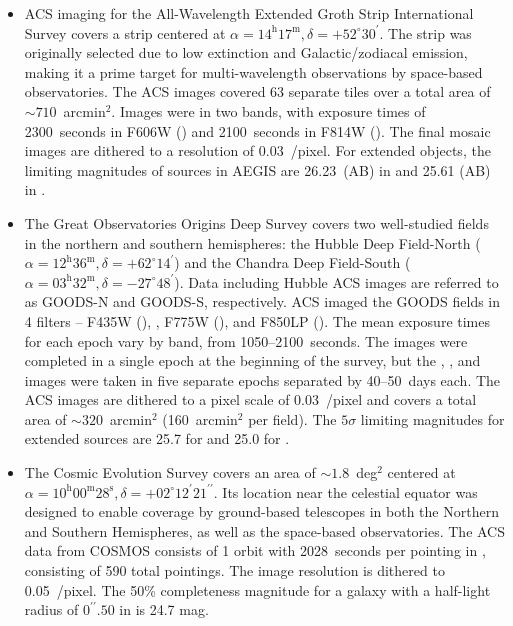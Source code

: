 \documentclass[twocolumn]{aastex6}
\begin{document}
\begin{itemize}
\item \hubble{} ACS imaging for the All-Wavelength Extended Groth Strip International Survey \citep[AEGIS;][]{dav07} covers a strip centered at $\alpha=14^\textrm{h}17^\textrm{m}, \delta=+52^\circ30^\prime$. The strip was originally selected due to low extinction and Galactic/zodiacal emission, making it a prime target for multi-wavelength observations by space-based observatories. The ACS images covered 63 separate tiles over a total area of $\sim710$~arcmin$^2$. Images were in two bands, with exposure times of 2300~seconds in F606W (\Vband) and 2100~seconds in F814W (\Iband). The final mosaic images are dithered to a resolution of 0.03~\arcsec/pixel. For extended objects, the limiting magnitudes of sources in AEGIS are 26.23~(AB) in \Vband{} and 25.61 (AB) in \Iband. 

\item The Great Observatories Origins Deep Survey \citep[GOODS;][]{gia04} covers two well-studied fields in the northern and southern hemispheres: the Hubble Deep Field-North ($\alpha=12^\textrm{h}36^\textrm{m}, \delta=+62^\circ14^\prime$) and the Chandra Deep Field-South ($\alpha=03^\textrm{h}32^\textrm{m}, \delta=-27^\circ48^\prime$). Data including Hubble ACS images are referred to as GOODS-N and GOODS-S, respectively. ACS imaged the GOODS fields in 4 filters -- F435W (\Bband), \Vband, F775W (\iband), and F850LP (\zband). The mean exposure times for each epoch vary by band, from 1050--2100~seconds. The \Bband{} images were completed in a single epoch at the beginning of the survey, but the \Vband, \iband, and \zband{} images were taken in five separate epochs separated by 40--50~days each. The ACS images are dithered to a pixel scale of 0.03~\arcsec/pixel and covers a total area of $\sim320$~arcmin$^2$ (160~arcmin$^2$ per field). The $5\sigma$ limiting magnitudes for extended sources are 25.7 for \Vband{} and 25.0 for \iband. 

\item The Cosmic Evolution Survey \citep[COSMOS;][]{sco07} covers an area of $\sim1.8$~deg$^2$ centered at $\alpha=10^\textrm{h}00^\textrm{m}28^\textrm{s}, \delta=+02^\circ12^\prime21^{\prime\prime}$. Its location near the celestial equator was designed to enable coverage by ground-based telescopes in both the Northern and Southern Hemispheres, as well as the space-based observatories. The \hst{} ACS data from COSMOS consists of 1 orbit with 2028~seconds per pointing in \Iband, consisting of 590 total pointings. The image resolution is dithered to 0.05~\arcsec/pixel. The 50\% completeness magnitude for a galaxy with a half-light radius of $0^{\prime\prime}.50$ in \Iband{} is 24.7 mag. 


\end{itemize}
\end{document}
